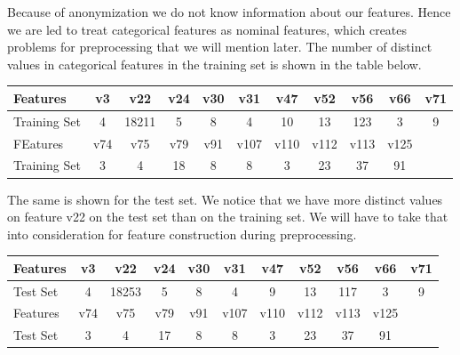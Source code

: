 \documentclass[conference, onecolumn]{IEEEtran}
\begin{document}
Because of anonymization we do not know information about our features. Hence we are led to treat categorical features as nominal features, which creates problems for preprocessing that we will mention later. The number of distinct values in categorical features in the training set is shown in the table below.
%
\begin{center}
\begin{tabular}{ |l|c|c|c|c|c|c|c|c|c|c| } 
 \hline
 Features & v3 & v22 & v24 & v30 & v31 & v47 & v52 & v56 & v66 & v71  \\ \hline
 Training Set & 4	& 18211	& 5	& 8 & 4 &	10 &	13	& 123	& 3 & 9\\ \hline
 FEatures & v74 & v75 & v79 & v91 & v107 & v110 & v112 & v113 & v125&\phantom{1}\\ \hline
  Training Set &  3 & 4 & 18 & 8	& 8	& 3	& 23	& 37	& 91&\phantom{1}\\ \hline
\end{tabular}
\end{center}
The same is shown for the test set. We notice that we have more distinct values on feature v22 on the test set than on the training set. We will have to take that into consideration for feature construction during preprocessing.
\begin{center}
\begin{tabular}{ |l|c|c|c|c|c|c|c|c|c|c| } 
 \hline
 Features & v3 & v22 & v24 & v30 & v31 & v47 & v52 & v56 & v66 & v71  \\ \hline
 Test Set & 4 & 18253 & 5 & 8 & 4 & 9 & 13 & 117 & 3&  9\\ \hline
 Features & v74 & v75 & v79 & v91 & v107 & v110 & v112 & v113 & v125&\phantom{1}\\ \hline
  Test Set 	&3	&4&	17& 8 & 	8&	3	&23	&37	&91 &\phantom{1}\\ \hline
\end{tabular}
\end{center}
\end{document}
